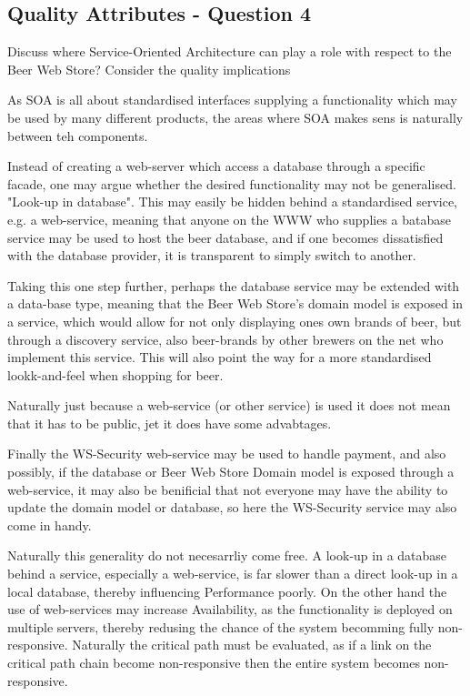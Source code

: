 \subsection{Quality Attributes - Question 4}
\label{sec:qa_q4}
\begin{question}
Discuss where Service-Oriented Architecture can play a role
with respect to the Beer Web Store? Consider the quality implications
\end{question}

As SOA is all about standardised interfaces supplying a functionality which may be used by many different products, the areas where SOA makes sens is naturally between teh components. 

Instead of creating a web-server which access a database through a specific facade, one may argue whether the desired functionality may not be generalised. "Look-up in database". This may easily be hidden behind a standardised service, e.g. a web-service, meaning that anyone on the WWW who supplies a batabase service may be used to host the beer database, and if one becomes dissatisfied with the database provider, it is transparent to simply switch to another. 

Taking this one step further, perhaps the database service may be extended with a data-base type, meaning that the Beer Web Store's domain model is exposed in a service, which would allow for not only displaying ones own brands of beer, but through a discovery service, also beer-brands by other brewers on the net who implement this service. This will also point the way for a more standardised lookk-and-feel when shopping for beer.

Naturally just because a web-service (or other service) is used it does not mean that it has to be public, jet it does have some advabtages.

Finally the WS-Security web-service may be used to handle payment, and also possibly, if the database or Beer Web Store Domain model is exposed through a web-service, it may also be benificial that not everyone may have the ability to update the domain model or database, so here the WS-Security service may also come in handy.

Naturally this generality do not necesarrliy come free. A look-up in a database behind a service, especially a web-service, is far slower than a direct look-up in a local database, thereby influencing Performance poorly. On the other hand the use of web-services may increase Availability, as the functionality is deployed on multiple servers, thereby redusing the chance of the system becomming fully non-responsive. Naturally the critical path must be evaluated, as if a link on the critical path chain become non-responsive then the entire system becomes non-responsive.

